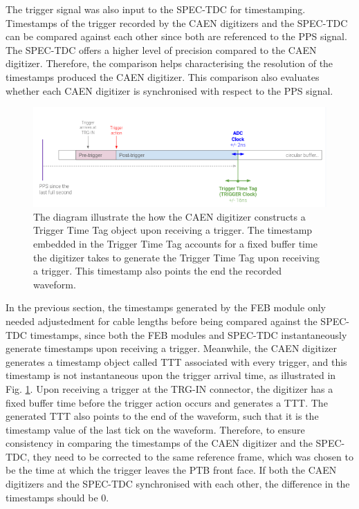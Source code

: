 The trigger signal was also input to the SPEC-TDC for timestamping.
Timestamps of the trigger recorded by the CAEN digitizers and the SPEC-TDC can be compared against each other since both are referenced to the PPS signal.
The SPEC-TDC offers a higher level of precision compared to the CAEN digitizer.
Therefore, the comparison helps characterising the resolution of the timestamps produced the CAEN digitizer. 
This comparison also evaluates whether each CAEN digitizer is synchronised with respect to the PPS signal.

\begin{figure}[htbp!] 
\centering    
\includegraphics[width=1.0\textwidth]{TTT_diagram}
\caption[TTT_diagram]{
The diagram illustrate the how the CAEN digitizer constructs a Trigger Time Tag object upon receiving a trigger.
The timestamp embedded in the Trigger Time Tag accounts for a fixed buffer time the digitizer takes to generate the Trigger Time Tag upon receiving a trigger.
This timestamp also points the end the recorded waveform.
}
\label{fig:TTT_diagram}
\end{figure}

In the previous section, the timestamps generated by the FEB module only needed adjustedment for cable lengths before being compared against the SPEC-TDC timestamps, since both the FEB modules and SPEC-TDC instantaneously generate timestamps upon receiving a trigger.
Meanwhile, the CAEN digitizer generates a timestamp object called TTT associated with every trigger, and this timestamp is not instantaneous upon the trigger arrival time, as illustrated in Fig. \ref{fig:TTT_diagram}. 
Upon receiving a trigger at the TRG-IN connector, the digitizer has a fixed buffer time before the trigger action occurs and generates a TTT.
The generated TTT also points to the end of the waveform, such that it is the timestamp value of the last tick on the waveform.
Therefore, to ensure consistency in comparing the timestamps of the CAEN digitizer and the SPEC-TDC, they need to be corrected to the same reference frame, which was chosen to be the time at which the trigger leaves the PTB front face.
If both the CAEN digitizers and the SPEC-TDC synchronised with each other, the difference in the timestamps should be 0.

